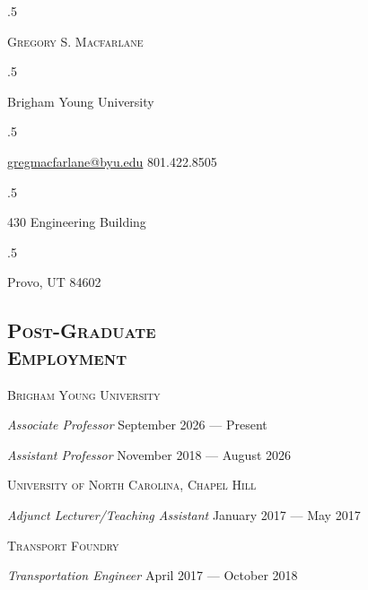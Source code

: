 \documentclass[margin,line]{res}
\newcommand{\acc}{\scshape }
\def\r{\noindent\makebox[\linewidth]{\rule{\linewidth}{0.4pt}}}
\let\oldsection\section\renewcommand{\section}[1]{\r \oldsection{\scshape{#1}}}
\newenvironment{list1}{
  \begin{list}{\ding{113}}{%
      \setlength{\itemsep}{0in}
      \setlength{\parsep}{0in} \setlength{\parskip}{0in}
      \setlength{\topsep}{0in} \setlength{\partopsep}{0in}
      \setlength{\leftmargin}{0.17in}}}{\end{list}}
\begin{document}
 \moveleft.5\hoffset\centerline{\LARGE\scshape Gregory S.  Macfarlane}
\vspace{.05in}
 \moveleft.5\hoffset\centerline{Brigham Young University}
 \moveleft.5\hoffset\centerline{
	 \href{mailto:gregmacfarlane@byu.edu}{gregmacfarlane@byu.edu}
   801.422.8505}
\vspace{.05in}
 \moveleft.5\hoffset\centerline{430 Engineering Building}
 \moveleft.5\hoffset\centerline{Provo, UT 84602}

\begin{resume}

\vspace{.05in}





\oldsection{\scshape Post-Graduate\\ Employment}

{\acc{Brigham Young University}}

\begin{list1}
\item[] \textit{Associate Professor} \hfill {September 2026 --- Present}
\item[] \textit{Assistant Professor} \hfill {November 2018 --- August 2026}
\end{list1}

{\acc{University of North Carolina, Chapel Hill}}

\begin{list1}
\item[]\textit{Adjunct Lecturer/Teaching Assistant} \hfill {January 2017 --- May 2017}
\end{list1}

{\acc{Transport Foundry}} 
\begin{list1}
  \item[] \textit{Transportation Engineer} \hfill {April 2017 --- October 2018}
\end{list1}


\end{resume}
\end{document}
